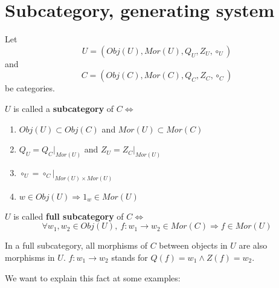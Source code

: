 \section{Subcategory, generating system}

\begin{definition}
Let \[ U = (Obj(U), Mor(U), Q_U, Z_U, \circ_U) \] and \[C = (Obj(C), Mor(C),
Q_C, Z_C, \circ_C)\] be categories.

$U$ is called a {\bf subcategory} of $C \iff$
\begin{enumerate}
  \item $Obj(U) \subset Obj(C)$ and $Mor(U) \subset Mor(C)$
  \item $Q_U = Q_C|_{Mor(U)}$ and $Z_U = Z_C|_{Mor(U)}$
  \item $\circ_U = \circ_C|_{Mor(U) \times Mor(U)}$
  \item $w \in Obj(U) \Rightarrow 1_w \in Mor(U)$
\end{enumerate}
\end{definition}

$U$ is called {\bf full subcategory} of $C \iff$
\[ \forall w_1, w_2 \in Obj(U),\ f: w_1 \to w_2 \in Mor(C) \Rightarrow f \in
Mor(U) \]

In a full subcategory, all morphisms of $C$ between objects in $U$ are also
morphisms in $U$. $f: w_1 \to w_2$ stands for $Q(f) = w_1 \wedge Z(f) = w_2$.

We want to explain this fact at some examples:

